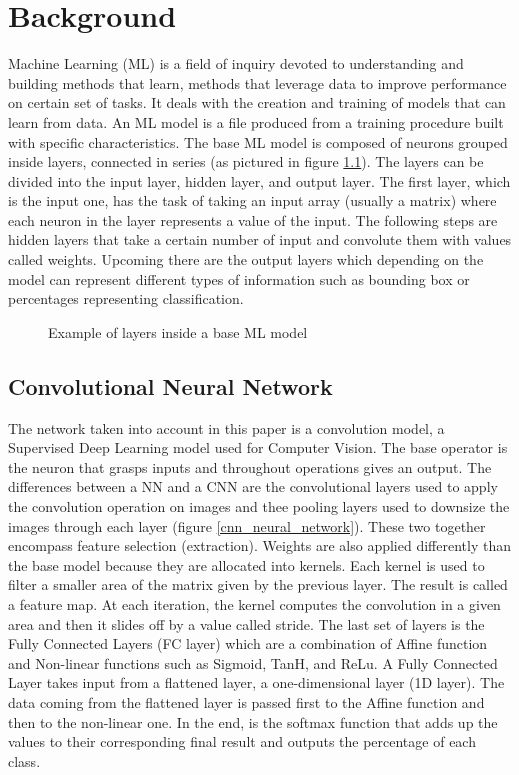 \chapter{Background}
\label{cha:Background}
\quad Machine Learning (ML) is a field of inquiry devoted to understanding and building methods that learn, methods that leverage data to improve performance on certain set of tasks. It deals with the creation and training of models that can learn from data. An ML model is a file produced from a training procedure built with specific characteristics. The base ML model is composed of neurons grouped inside layers, connected in series (as pictured in figure \ref{base_neural_network}). The layers can be divided into the input layer, hidden layer, and output layer. The first layer, which is the input one, has the task of taking an input array (usually a matrix) where each neuron in the layer represents a value of the input. The following steps are hidden layers that take a certain number of input and convolute them with values called weights. Upcoming there are the output layers which depending on the model can represent different types of information such as bounding box or percentages representing classification.   

\begin{figure}[!ht]
\centerline{}
\caption{Example of layers inside a base ML model \cite{Quantum_machine_learning}}
\label{base_neural_network}
\end{figure}

\section{Convolutional Neural Network}
\label{sec:context}
\quad The network taken into account in this paper is a convolution model, a Supervised Deep Learning model used for Computer Vision. The base operator is the neuron that grasps inputs and throughout operations gives an output. The differences between a NN and a CNN are the convolutional layers used to apply the convolution operation on images and thee pooling layers used to downsize the images through each layer (figure \ref{cnn_neural_network}). These two together encompass feature selection (extraction). Weights are also applied differently than the base model because they are allocated into kernels. Each kernel is used to filter a smaller area of the matrix given by the previous layer. The result is called a feature map. At each iteration, the kernel computes the convolution in a given area and then it slides off by a  value called stride. The last set of layers is the Fully Connected Layers (FC layer) which are a combination of Affine function and Non-linear functions such as Sigmoid, TanH, and ReLu. A Fully Connected Layer takes input from a flattened layer, a one-dimensional layer (1D layer). The data coming from the flattened layer is passed first to the Affine function and then to the non-linear one. In the end, is the softmax function that adds up the values to their corresponding final result and outputs the percentage of each class.

